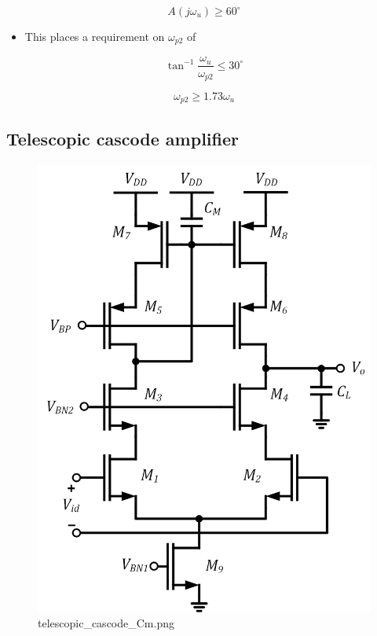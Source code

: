 \documentclass[11pt]{article}
\providecommand{\tightlist}{%
      \setlength{\itemsep}{0pt}\setlength{\parskip}{0pt}}
\begin{document}
\begin{equation}
A(j\omega_u) \geq 60^{\circ}
\end{equation}

\begin{itemize}
\tightlist
\item
  This places a requirement on \(\omega_{p2}\) of
\end{itemize}

\begin{equation}
\tan^{-1}\dfrac{\omega_u}{\omega_{p2}} \leq 30^{\circ}
\end{equation}

\begin{equation}
\boxed{\omega_{p2} \geq 1.73\omega_u}
\end{equation}

    \hypertarget{telescopic-cascode-amplifier}{%
\subsection{Telescopic cascode
amplifier}\label{telescopic-cascode-amplifier}}

    \begin{figure}
\centering
\includegraphics{telescopic_cascode_Cm.png}
\caption{telescopic\_cascode\_Cm.png}
\end{figure}
\end{document}
